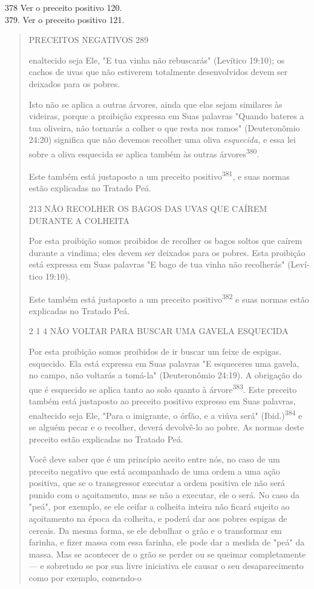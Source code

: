 378 Ver o preceito positivo 120.\\
379. Ver o preceito positivo 121.

\begin{quote}
PRECEITOS NEGATIVOS 289

enaltecido seja Ele, "E tua vinha não rebuscarás" (Levítico 19:10); os
cachos de uvas que não estiverem totalmente desenvolvidos devem ser
deixados para os pobres.

Isto não se aplica a outras árvores, ainda que elas sejam similares às
videiras, porque a proibição expressa em Suas palavras "Quando bateres a
tua oliveira, não tornarás a colher o que resta nos ramos" (Deuteronômio
24:20) significa que não devemos recolher uma oliva \emph{esquecida,} e
essa lei sobre a oli­va esquecida se aplica também às outras
árvores\textsuperscript{380}.

Este também está justaposto a um preceito positivo\textsuperscript{381},
e suas nor­mas estão explicadas no Tratado Peá.

213 NÃO RECOLHER OS BAGOS DAS UVAS QUE CAÍREM DURANTE A COLHEITA

Por esta proibição somos proibidos de recolher os bagos soltos que
caírem durante a vindima; eles devem ser deixados para os pobres. Esta
proibi­ção está expressa em Suas palavras "E bago de tua vinha não
recolherás" (Leví­tico 19:10).

Este também está justaposto a um preceito positivo\textsuperscript{382}
e suas nor­mas estão explicadas no Tratado Peá.

2 1 4 NÃO VOLTAR PARA BUSCAR UMA GAVELA ESQUECIDA

Por esta proibição somos proibidos de ir buscar um feixe de espigas.
esquecido. Ela está expressa em Suas palavras "E esqueceres uma gavela,
no campo, não voltarás a tomá-la" (Deuteronômio 24:19). A obrigação do
que é esquecido se aplica tanto ao solo quanto à
árvore\textsuperscript{383}. Este preceito também está justaposto ao
preceito positivo expresso em Suas palavras, enaltecido seja Ele, "Para
o imigrante, o órfão, e a viúva será" (Ibid.)\textsuperscript{384} e se
alguém pecar e o re­colher, deverá devolvê-lo ao pobre. As normas deste
preceito estão explicadas no Tratado Peá.

Você deve saber que é um princípio aceito entre nós, no caso de um
preceito negativo que está acompanhado de uma ordem a uma ação positiva,
que se o transgressor executar a ordem positiva ele não será punido com
o açoitamento, mas se não a executar, ele o será. No caso da "peá", por
exemplo, se ele ceifar a colheita inteira não ficará sujeito ao
açoitamento na época da colheita, e poderá dar aos pobres espigas de
cereais. Da mesma for­ma, se ele debulhar o grão e o transformar em
farinha, e fizer massa com essa farinha, ele pode dar a medida de "peá"
da massa. Mas se acontecer de o grão se perder ou se queimar
completamente --- e sobretudo se por sua livre iniciativa ele causar o
seu desaparecimento como por exemplo, comendo-o
\end{quote}

